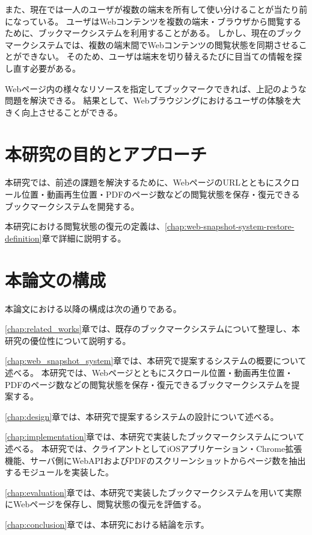 また、現在では一人のユーザが複数の端末を所有して使い分けることが当たり前になっている。
ユーザはWebコンテンツを複数の端末・ブラウザから閲覧するために、ブックマークシステムを利用することがある。
しかし、現在のブックマークシステムでは、複数の端末間でWebコンテンツの閲覧状態を同期させることができない。
そのため、ユーザは端末を切り替えるたびに目当ての情報を探し直す必要がある。

Webページ内の様々なリソースを指定してブックマークできれば、上記のような問題を解決できる。
結果として、Webブラウジングにおけるユーザの体験を大きく向上させることができる。

\section{本研究の目的とアプローチ}
本研究では、前述の課題を解決するために、WebページのURLとともにスクロール位置・動画再生位置・PDFのページ数などの閲覧状態を保存・復元できるブックマークシステムを開発する。

本研究における閲覧状態の復元の定義は、\ref{chap:web-snapshot-system-restore-definition}章で詳細に説明する。

\section{本論文の構成}

本論文における以降の構成は次の通りである。

\ref{chap:related_works}章では、既存のブックマークシステムについて整理し、本研究の優位性について説明する。

\ref{chap:web_snapshot_system}章では、本研究で提案するシステムの概要について述べる。
本研究では、Webページとともにスクロール位置・動画再生位置・PDFのページ数などの閲覧状態を保存・復元できるブックマークシステムを提案する。

\ref{chap:design}章では、本研究で提案するシステムの設計について述べる。

\ref{chap:implementation}章では、本研究で実装したブックマークシステムについて述べる。
本研究では、クライアントとしてiOSアプリケーション・Chrome拡張機能、サーバ側にWebAPIおよびPDFのスクリーンショットからページ数を抽出するモジュールを実装した。

\ref{chap:evaluation}章では、本研究で実装したブックマークシステムを用いて実際にWebページを保存し、閲覧状態の復元を評価する。

\ref{chap:conclusion}章では、本研究における結論を示す。